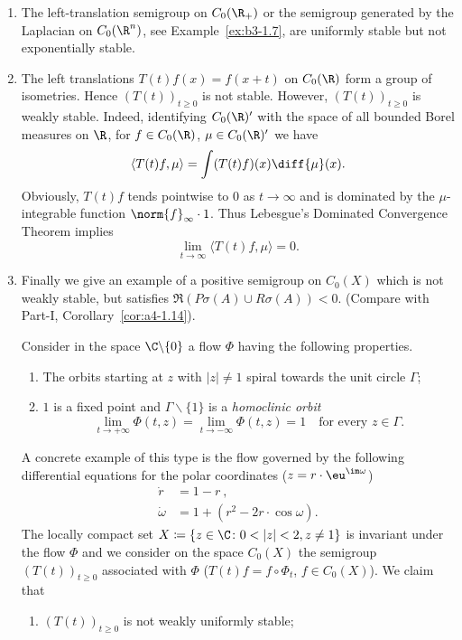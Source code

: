 \begin{example}\label{ex:b4-1.2}
%
%
\begin{enumerate}[\upshape (i), wide, labelindent=.25em]
\item
The left-translation semigroup on $C_{0}(\R_+)$ or the semigroup generated by the Laplacian on $C_{0}(\R^n)$, see Example~\ref{ex:b3-1.7}, are uniformly stable but not exponentially stable.

\item 
The left translations $T(t)f(x) = f(x+t)$ on $C_{0}(\R)$ form a group of isometries. 
Hence $(T(t))_{t \geq 0}$ is not stable. 
However, $(T(t))_{t \geq 0}$ is weakly stable. 
Indeed, identifying $C_{0}(\R)'$ with the space of all bounded Borel measures on $\R$, for $f \in C_{0}(\R)$, $\mu \in C_{0}(\R)'$ we have
\[
   \langle T(t)f,\mu \rangle = \int (T(t)f)(x) \diff{\mu}(x) .
\]
Obviously, $T(t)f$ tends pointwise to $0$ as $t \to \infty$ and is dominated by the $\mu$-integrable function $\norm{f}_\infty \cdot 1$. 
Thus Lebesgue's Dominated Convergence Theorem implies
\[ 
\lim_{t\to\infty} \langle T(t)f,\mu \rangle = 0.
\]

\item 
Finally we give an example of a positive semigroup on $C_{0}(X)$ which is not weakly stable, but satisfies $\Re (P\sigma(A) \cup R\sigma(A)) < 0$. (Compare with Part-I, Corollary~\ref{cor:a4-1.14}).

Consider in the space $\C\backslash\{0\}$ a flow $\Phi$ having the following properties.%
\begin{enumerate}[--]
	\item 
	The orbits starting at $z$ with $|z| \neq 1$ spiral towards the unit circle $\Gamma$;
	
	\item 
	$1$ is a fixed point and $\Gamma\backslash\{1\}$ is a \emph{homoclinic orbit} \ie
    \[
    \lim_{t\to+\infty} \Phi(t,z) = \lim_{t\to-\infty} \Phi(t,z) = 1 \quad \text{for every $z \in \Gamma$.}
    \]
\end{enumerate}

A concrete example of this type is the flow governed by the following differential equations for the polar coordinates (\ie $z = r\cdot \eu^{\im\omega}$)
\begin{align*}
   \dot{r} &= 1 - r~,\\
   \dot{\omega} &= 1 + (r^2 - 2r\cdot\cos \omega) .
\end{align*}
The locally compact set $X \coloneq
 \{z \in \C \colon 0  <  |z|  <  2, z \neq 1\}$ is invariant under the flow $\Phi$ and we consider on the space $C_{0}(X)$ the semigroup $(T(t))_{t \geq 0}$ associated with $\Phi$ (\ie $T(t)f = f\circ\Phi_t$, $f \in C_{0}(X)$). 
 We claim that
\begin{enumerate}[\upshape (i)]
	\item
	$(T(t))_{t \geq 0}$ is not weakly uniformly stable;
	

\end{enumerate}
\end{enumerate}
\end{example}
